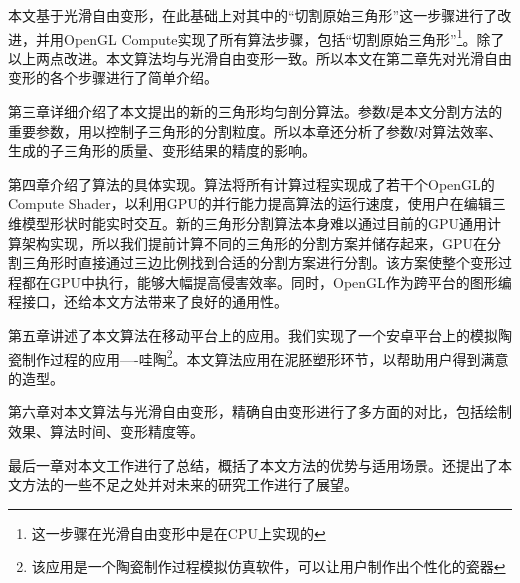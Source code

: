 本文基于光滑自由变形，在此基础上对其中的“切割原始三角形”这一步骤进行了改进，并用OpenGL Compute实现了所有算法步骤，包括“切割原始三角形”\footnote{这一步骤在光滑自由变形中是在CPU上实现的}。除了以上两点改进。本文算法均与光滑自由变形一致。所以本文在第二章先对光滑自由变形\cite{Cui15}的各个步骤进行了简单介绍。

第三章详细介绍了本文提出的新的三角形均匀剖分算法。参数$l$是本文分割方法的重要参数，用以控制子三角形的分割粒度。所以本章还分析了参数$l$对算法效率、生成的子三角形的质量、变形结果的精度的影响。

第四章介绍了算法的具体实现。算法将所有计算过程实现成了若干个OpenGL的Compute Shader，以利用GPU的并行能力提高算法的运行速度，使用户在编辑三维模型形状时能实时交互。新的三角形分割算法本身难以通过目前的GPU通用计算架构实现，所以我们提前计算不同的三角形的分割方案并储存起来，GPU在分割三角形时直接通过三边比例找到合适的分割方案进行分割。该方案使整个变形过程都在GPU中执行，能够大幅提高侵害效率。同时，OpenGL作为跨平台的图形编程接口，还给本文方法带来了良好的通用性。

第五章讲述了本文算法在移动平台上的应用。我们实现了一个安卓平台上的模拟陶瓷制作过程的应用----哇陶\footnote{该应用是一个陶瓷制作过程模拟仿真软件，可以让用户制作出个性化的瓷器}。本文算法应用在泥胚塑形环节，以帮助用户得到满意的造型。

第六章对本文算法与光滑自由变形\cite{Cui15}，精确自由变形\cite{Feng00}进行了多方面的对比，包括绘制效果、算法时间、变形精度等。

最后一章对本文工作进行了总结，概括了本文方法的优势与适用场景。还提出了本文方法的一些不足之处并对未来的研究工作进行了展望。




